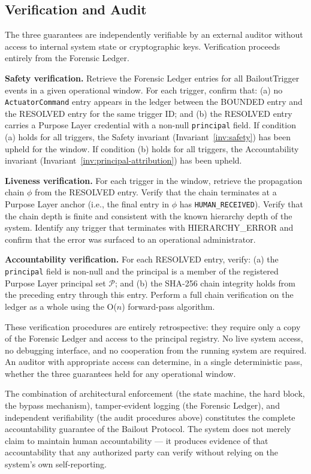 \subsection{Verification and Audit}
\label{sec:guarantee-verification}

The three guarantees are independently verifiable by an external auditor without access to internal system state or cryptographic keys. Verification proceeds entirely from the Forensic Ledger.

\medskip

\noindent\textbf{Safety verification.} Retrieve the Forensic Ledger entries for all BailoutTrigger events in a given operational window. For each trigger, confirm that: (a) no \texttt{ActuatorCommand} entry appears in the ledger between the BOUNDED entry and the RESOLVED entry for the same trigger ID; and (b) the RESOLVED entry carries a Purpose Layer credential with a non-null \texttt{principal} field. If condition (a) holds for all triggers, the Safety invariant (Invariant~\ref{inv:safety}) has been upheld for the window. If condition (b) holds for all triggers, the Accountability invariant (Invariant~\ref{inv:principal-attribution}) has been upheld.

\medskip

\noindent\textbf{Liveness verification.} For each trigger in the window, retrieve the propagation chain $\phi$ from the RESOLVED entry. Verify that the chain terminates at a Purpose Layer anchor (i.e., the final entry in $\phi$ has \texttt{HUMAN\_RECEIVED}). Verify that the chain depth is finite and consistent with the known hierarchy depth of the system. Identify any trigger that terminates with HIERARCHY\_ERROR and confirm that the error was surfaced to an operational administrator.

\medskip

\noindent\textbf{Accountability verification.} For each RESOLVED entry, verify: (a) the \texttt{principal} field is non-null and the principal is a member of the registered Purpose Layer principal set $\mathcal{P}$; and (b) the SHA-256 chain integrity holds from the preceding entry through this entry. Perform a full chain verification on the ledger as a whole using the O($n$) forward-pass algorithm.

These verification procedures are entirely retrospective: they require only a copy of the Forensic Ledger and access to the principal registry. No live system access, no debugging interface, and no cooperation from the running system are required. An auditor with appropriate access can determine, in a single deterministic pass, whether the three guarantees held for any operational window.

The combination of architectural enforcement (the state machine, the hard block, the bypass mechanism), tamper-evident logging (the Forensic Ledger), and independent verifiability (the audit procedures above) constitutes the complete accountability guarantee of the Bailout Protocol. The system does not merely claim to maintain human accountability — it produces evidence of that accountability that any authorized party can verify without relying on the system's own self-reporting.
